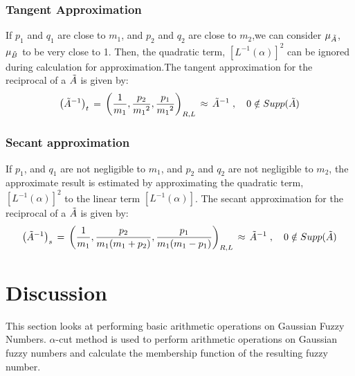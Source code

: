 \documentclass{article}
\begin{document}
\subsubsection{Tangent Approximation}

If $p_1$ and $q_1$ are close to $m_1$, and $p_2$ and $q_2$ are close to $m_2$,we can consider $\mu_{\Tilde{A}}$, $\mu_{\Tilde{B}}$ to be very close to 1. Then, the quadratic term, $\left[L^{-1}(\alpha)\right]^2$ can be ignored during calculation for approximation.\newline The tangent approximation for the reciprocal of a $\Tilde{A}$ is given by:
\begin{equation}
    \left(\Tilde{A}^{-1}\right)_t \,=\, \left(\frac{1}{m_1}, \frac{p_2}{{m_1}^2}, \frac{p_1}{{m_1}^2}\right)_{R,L} \, \approx\, \Tilde{A}^{-1}\;, \quad 0\notin Supp(\Tilde{A})
\end{equation}

\subsubsection{Secant approximation}
If $p_1$, and $q_1$ are not negligible to $m_1$, and $p_2$ and $q_2$ are not negligible to $m_2$, the approximate result is estimated by approximating the quadratic term, $\left[L^{-1}(\alpha)\right]^2$ to the linear term $\left[L^{-1}(\alpha)\right]$. The secant approximation for the reciprocal of a $\Tilde{A}$ is given by:
\begin{equation}
    \left(\Tilde{A}^{-1}\right)_s \,=\, \left(\frac{1}{m_1}, \frac{p_2}{m_1(m_1 + p_2)}, \frac{p_1}{m_1(m_1 - p_1)}\right)_{R,L} \, \approx\, \Tilde{A}^{-1}\;, \quad 0\notin Supp(\Tilde{A})
\end{equation} 




\section{Discussion}
This section looks at performing basic arithmetic operations on Gaussian Fuzzy Numbers. $\alpha$-cut method is used to perform arithmetic operations on Gaussian fuzzy numbers and calculate the membership function of the resulting fuzzy number. 
    
\end{document}
